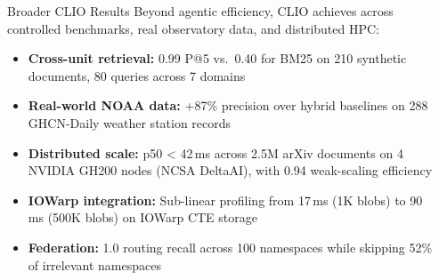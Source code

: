 \documentclass[final]{beamer}
\newlength{\sepwidth}
\newlength{\colwidth}
\newcommand{\separatorcolumn}{\begin{column}{\sepwidth}\end{column}}
\begin{document}
\begin{frame}[t]
\begin{columns}[t]
\begin{column}{\colwidth}

  \begin{block}{Broader CLIO Results}
    \justifying
    Beyond agentic efficiency, CLIO achieves across controlled
    benchmarks, real observatory data, and distributed HPC:
    \vspace{0.3em}
    \begin{itemize}
    \justifying
    \itemsep0.3em
      \item \textbf{Cross-unit retrieval:} 0.99 P@5 vs.\ 0.40 for
        BM25 on 210 synthetic documents, 80 queries across 7 domains
      \item \textbf{Real-world NOAA data:} +87\% precision over hybrid
        baselines on 288 GHCN-Daily weather station records
      \item \textbf{Distributed scale:} p50 < 42\,ms across 2.5M arXiv
        documents on 4 NVIDIA GH200 nodes (NCSA DeltaAI), with 0.94
        weak-scaling efficiency
      \item \textbf{IOWarp integration:} Sub-linear profiling from 17\,ms
        (1K blobs) to 90\,ms (500K blobs) on IOWarp CTE storage
      \item \textbf{Federation:} 1.0 routing recall across 100 namespaces
        while skipping 52\% of irrelevant namespaces
    \end{itemize}
  \end{block}

\end{column}

\separatorcolumn

\end{columns}

\end{frame}
\end{document}
